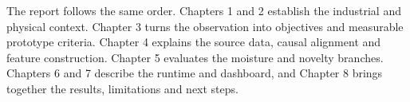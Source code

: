The report follows the same order. Chapters 1 and 2 establish the industrial and physical context. Chapter 3 turns the observation into objectives and measurable prototype criteria. Chapter 4 explains the source data, causal alignment and feature construction. Chapter 5 evaluates the moisture and novelty branches. Chapters 6 and 7 describe the runtime and dashboard, and Chapter 8 brings together the results, limitations and next steps.
